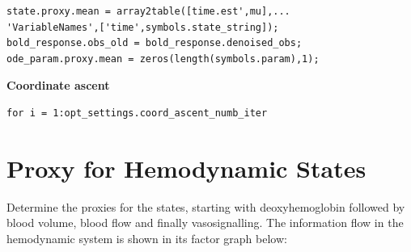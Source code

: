 \color{RoyalPurple}\begin{verbatim}
state.proxy.mean = array2table([time.est',mu],...
'VariableNames',['time',symbols.state_string]);
bold_response.obs_old = bold_response.denoised_obs;
ode_param.proxy.mean = zeros(length(symbols.param),1);
\end{verbatim} 
\color{black}
\vspace{1.5em}

\textbf{Coordinate ascent}

\color{RoyalPurple}\begin{verbatim}
for i = 1:opt_settings.coord_ascent_numb_iter
\end{verbatim} 
\color{black}


\section{Proxy for Hemodynamic States}

\begin{par}
Determine the proxies for the states, starting with deoxyhemoglobin followed by blood volume, blood flow and finally vasosignalling. The information flow in the hemodynamic system is shown in its factor graph below:
\end{par} \vspace{1em}


